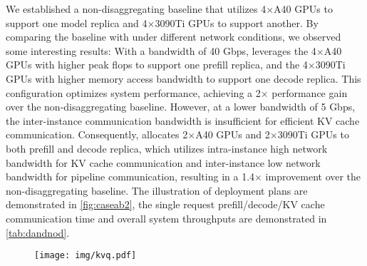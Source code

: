 {We established a non-disaggregating baseline that utilizes 4$\times$A40 GPUs to support one model replica and 4$\times$3090Ti GPUs to support another. By comparing the baseline with \sys under different network conditions, we observed some interesting results: With a bandwidth of 40 Gbps, \sys leverages the 4$\times$A40 GPUs with higher peak flops to support one prefill replica, and the 4$\times$3090Ti GPUs with higher memory access bandwidth to support one decode replica. This configuration optimizes system performance, achieving a 2$\times$ performance gain over the non-disaggregating baseline. However, at a lower bandwidth of 5 Gbps, the inter-instance communication bandwidth is insufficient for efficient KV cache communication. Consequently, \sys allocates 2$\times$A40 GPUs and 2$\times$3090Ti GPUs to both prefill and decode replica, which utilizes intra-instance high network bandwidth for KV cache communication and inter-instance low network bandwidth for pipeline communication, resulting in a 1.4$\times$ improvement over the non-disaggregating baseline. The illustration of deployment plans are demonstrated in \autoref{fig:caseab2}, the single request prefill/decode/KV cache communication time and overall system throughputs are demonstrated in \autoref{tab:dandnod}.
}

\begin{figure}[!t]
  \centering
  \texttt{[image: img/kvq.pdf]}
    \vspace{-1em}
  \caption{}
  \label{fig:kvcache}
    \vspace{-1em}
\end{figure}


